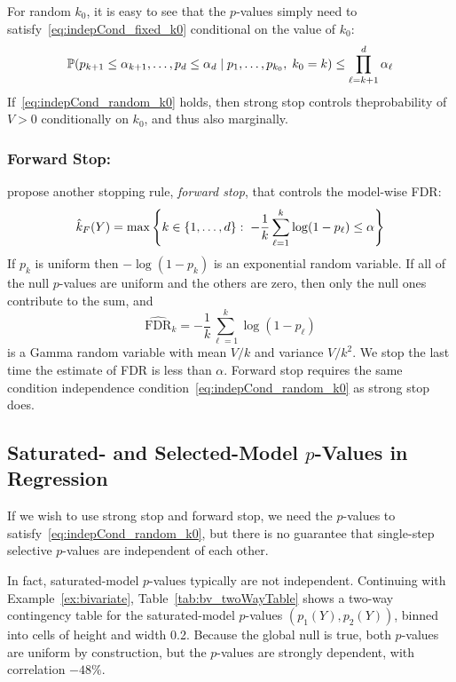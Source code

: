 \documentclass{article}
\begin{document}
For random $k_0$, it is easy to see that the $p$-values simply need to satisfy~\eqref{eq:indepCond_fixed_k0} conditional on the value of $k_0$:
\begin{equation}\label{eq:indepCond_random_k0}
  \P(p_{k+1} \leq \alpha_{k+1}, \ldots, p_d \leq \alpha_d
  \mid p_1, \ldots, p_{k_0}, \; k_0 = k) \leq \prod_{\ell=k+1}^d \alpha_\ell
\end{equation}
If~\eqref{eq:indepCond_random_k0} holds, then strong stop controls theprobability of $V>0$ conditionally on $k_0$, and thus also marginally.

\subsubsection{Forward Stop:}

\citet{gsell2013sequential} propose another stopping rule, {\em forward stop}, that controls the model-wise FDR:
\[
  \hk_{F}(Y) = \max\left\{k \in \{1,\ldots,d\} :\;
    -\frac{1}{k}\sum_{\ell=1}^k \log(1-p_\ell) \leq \alpha\right\}
\]
If $p_k$ is uniform then  $-\log(1-p_k)$ is an exponential random variable. If all of the null $p$-values are uniform and the others are zero, then only the null ones contribute to the sum, and
\[
\widehat{\text{FDR}}_k = -\frac{1}{k}\sum_{\ell=1}^k \log(1-p_\ell)
\]
is a Gamma random variable with mean $V/k$ and variance $V/k^2$. We stop the last time the estimate of FDR is less than $\alpha$. Forward stop requires the same condition independence condition~\eqref{eq:indepCond_random_k0} as strong stop does.

\subsection{Saturated- and Selected-Model $p$-Values in Regression}

If we wish to use strong stop and forward stop, we need the $p$-values to satisfy~\eqref{eq:indepCond_random_k0}, but there is no guarantee that single-step selective $p$-values are independent of each other.

In fact, saturated-model $p$-values typically are not independent. Continuing with Example~\ref{ex:bivariate}, Table~\ref{tab:bv_twoWayTable} shows a two-way contingency table for the saturated-model $p$-values $(p_1(Y), p_2(Y))$, binned into cells of height and width 0.2. Because the global null is true, both $p$-values are uniform by construction, but the $p$-values are strongly dependent, with correlation $-48\%$.
\end{document}
